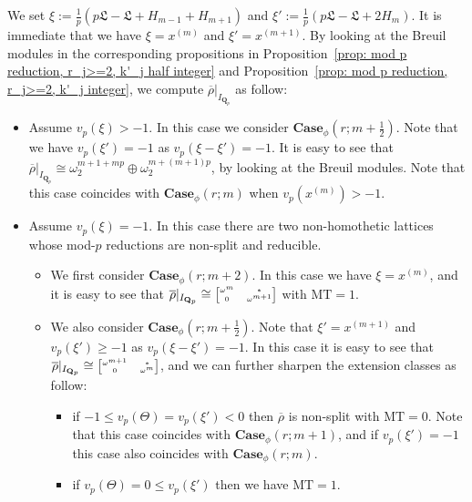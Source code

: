\documentclass[11pt]{amsart}
\theoremstyle{definition}
\numberwithin{equation}{subsection}
\theoremstyle{plain}
\theoremstyle{plain}
\theoremstyle{plain}
\theoremstyle{plain}
\theoremstyle{plain}
\theoremstyle{plain}
\theoremstyle{plain}
\theoremstyle{plain}
\theoremstyle{plain}
\theoremstyle{plain}
\theoremstyle{plain}
\theoremstyle{plain}
\theoremstyle{definition}
\theoremstyle{definition}
\theoremstyle{definition}
\theoremstyle{remark}
\renewcommand{\(}{\textup{(}}
\renewcommand{\)}{\textup{)}}
\newcommand{\Qp}{\mathbf{Q}_p}
\newcommand{\rhobar}{\overline{\rho}}
\newcommand{\fL}{\mathfrak{L}}
\begin{document}
We set $\xi:=\frac{1}{p}(p\fL-\fL+H_{m-1}+H_{m+1})$ and $\xi':=\frac{1}{p}(p\fL-\fL+2H_m)$. It is immediate that we have $\xi=x^{(m)}$ and $\xi'=x^{(m+1)}$. By looking at the Breuil modules in the corresponding propositions in Proposition~\ref{prop: mod p reduction, r_j>=2, k'_j half integer} and Proposition~\ref{prop: mod p reduction, r_j>=2, k'_j integer}, we compute $\rhobar|_{I_{\Qp}}$ as follow:
\begin{itemize}[leftmargin=*]
\item Assume $v_p(\xi)>-1$. In this case we consider $\mathbf{Case}_\phi(r;m+\frac{1}{2})$. Note that we have $v_p(\xi')=-1$ as $v_p(\xi-\xi')=-1$. It is easy to see that $\rhobar|_{I_{\Qp}}\cong\omega_2^{m+1+mp}\oplus\omega_2^{m+(m+1)p}$, by looking at the Breuil modules. Note that this case coincides with $\mathbf{Case}_\phi(r;m)$ when $v_p(x^{(m)})>-1$.
\item Assume $v_p(\xi)=-1$. In this case there are two non-homothetic lattices whose mod-$p$ reductions are non-split and reducible.
\begin{itemize}[leftmargin=*]
    \item We first consider $\mathbf{Case}_\phi(r;m+2)$. In this case we have $\xi=x^{(m)}$, and it is easy to see that $\rhobar|_{I_{\Qp}}\cong
\begin{tiny}\begin{bmatrix}
    \omega^m & * \\ 0 & \omega^{m+1}
\end{bmatrix}\end{tiny}$ with $\mathrm{MT}=1$.
    \item We also consider $\mathbf{Case}_\phi(r;m+\frac{1}{2})$. Note that $\xi'=x^{(m+1)}$ and $v_p(\xi')\geq -1$ as $v_p(\xi-\xi')=-1$. In this case it is easy to see that $\rhobar|_{I_{\Qp}}\cong
        \begin{tiny}\begin{bmatrix}
         \omega^{m+1} & * \\ 0 & \omega^{m}
        \end{bmatrix}\end{tiny}$, and we can further sharpen the extension classes as follow:
       \begin{itemize}[leftmargin=*]
       \item if $-1\leq v_p(\Theta)= v_p(\xi')<0$ then $\rhobar$ is non-split with $\mathrm{MT}=0$. Note that this case coincides with $\mathbf{Case}_\phi(r;m+1)$, and if $v_p(\xi')=-1$ this case also coincides with $\mathbf{Case}_\phi(r;m)$.
       \item if $v_p(\Theta)=0\leq v_p(\xi')$ then we have $\mathrm{MT}=1$.

\end{itemize}
\end{itemize}
\end{itemize}
\end{document}
